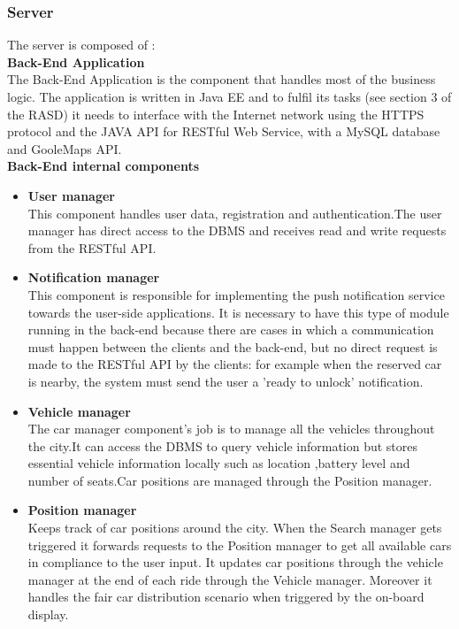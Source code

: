 \subsubsection{Server}
The server is composed of :\\[0.4in]
\textbf{Back-End Application}\\[0.1in]
The Back-End Application is the  component that handles most of the business logic.
The application is written in Java EE and to fulfil its tasks (see section
3 of the RASD) it needs to interface with the Internet network using
the HTTPS protocol and the JAVA API for RESTful Web Service, with a
MySQL database and GooleMaps API.\\[0.4in]
\textbf{Back-End internal components}\\[0.1in]
\begin{itemize}

\item \textbf{User manager}\\
This component handles user data, registration and authentication.The user manager has direct access to the DBMS and receives read and write requests from the RESTful API.

\item \textbf{Notification manager}\\
This component is responsible for implementing the push notification service towards
the user-side applications.
It is necessary to have this type of module running in the back-end because
there are cases in which a communication must happen between the clients and
the back-end, but no direct request is made to the RESTful API by the clients:
for example when the reserved car is nearby, the system must send the user a 'ready to unlock' notification.

\item \textbf{Vehicle manager}\\
The car manager component's job is to manage all the vehicles throughout the city.It can access the DBMS to query vehicle information but stores essential vehicle information locally such as location ,battery level and number of seats.Car positions
are managed through the Position manager.

\item \textbf{Position manager}\\
Keeps track of car positions around the city. When the Search manager gets triggered it forwards requests to the Position manager to get all available cars in compliance to the user input. It updates car positions through the vehicle manager at the end of each ride through the Vehicle manager. Moreover it handles the fair car distribution scenario when triggered by the on-board display. 


\end{itemize}
